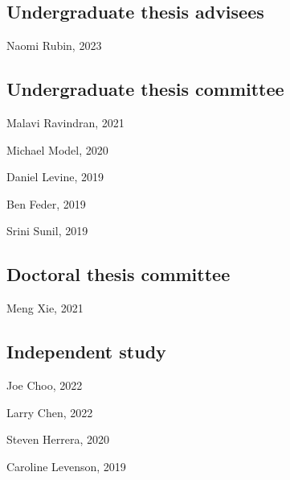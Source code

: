 \documentclass[11pt,dvipsnames]{article}
\providecommand{\tightlist}{%
  \setlength{\itemsep}{0pt}\setlength{\parskip}{0pt}}
\renewenvironment{itemize}{
  \begin{list}{}{
    \setlength{\leftmargin}{1.5em}
  }
}{
  \end{list}
}
\begin{document}
\hypertarget{undergraduate-thesis-advisees}{%
\subsection{Undergraduate thesis
advisees}\label{undergraduate-thesis-advisees}}

\begin{itemize}
\tightlist
\item
  Naomi Rubin, 2023
\end{itemize}

\hypertarget{undergraduate-thesis-committee}{%
\subsection{Undergraduate thesis
committee}\label{undergraduate-thesis-committee}}

\begin{itemize}
\item Malavi Ravindran, 2021
\item Michael Model, 2020
\item Daniel Levine, 2019
\item Ben Feder, 2019
\item Srini Sunil, 2019
\end{itemize}

\hypertarget{doctoral-thesis-committee}{%
\subsection{Doctoral thesis committee}\label{doctoral-thesis-committee}}

\begin{itemize}
\tightlist
\item
  Meng Xie, 2021
\end{itemize}

\hypertarget{independent-study}{%
\subsection{Independent study}\label{independent-study}}

\begin{itemize}
\item Joe Choo, 2022
\item Larry Chen, 2022
\item Steven Herrera, 2020
\item Caroline Levenson, 2019
\end{itemize}
\end{document}
